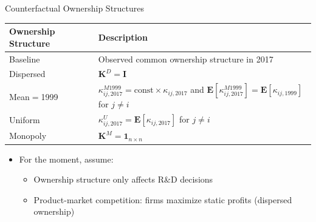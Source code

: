 \documentclass[
  10pt,
  aspectratio=169,   %
]{beamer}
\theoremstyle{plain}
\begin{document}
\begin{frame}{Counterfactual Ownership Structures}
  \begin{table}[h]
    \centering
    \renewcommand{\arraystretch}{1.5} %
    \begin{tabular}{ll}
      \toprule
      Ownership Structure & Description                                                                                                                                                       \\
      \midrule
      Baseline            & Observed common ownership structure in 2017                                                                                                                              \\
      Dispersed           & $\bm{K}^D=\bm{I}$                                                                                                                                                 \\
      Mean$=$1999         & $\kappa_{ij,2017}^{M1999}=\text{const}\times\kappa_{ij,2017}$ and $\bm{E}\left[\kappa_{ij,2017}^{M1999}\right]=\bm{E}\left[\kappa_{ij,1999}\right]$ for $j\neq i$ \\
      Uniform             & $\kappa_{ij,2017}^U=\bm{E}\left[\kappa_{ij, 2017}\right]$ for $j\neq i$                                                                                           \\
      Monopoly            & $\bm{K}^M=\bm{1}_{n\times n}$                                                                                                                                     \\
      \bottomrule
    \end{tabular}
    \renewcommand{\arraystretch}{1.0} %
  \end{table}

  \begin{itemize}
    \item For the moment, assume:
          \begin{itemize}
            \item Ownership structure only affects R\&D decisions
            \item Product-market competition: firms maximize static profits (dispersed ownership)
          \end{itemize}
  \end{itemize}
\end{frame}
\end{document}
